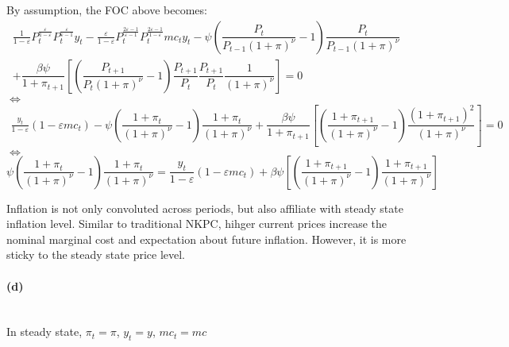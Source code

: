 \documentclass{article}
\begin{document}
By assumption, the FOC above becomes:
\begin{multline*}
    \frac{1}{1-\varepsilon}P_{t}^{\frac{\varepsilon}{1-\varepsilon}}P_{t}^{\frac{\varepsilon}{\varepsilon-1}}y_{t}-\frac{\varepsilon}{1-\varepsilon}P_{t}^{\frac{2\varepsilon-1}{\varepsilon-1}}P_{t}^{\frac{2\varepsilon-1}{1-\varepsilon}}mc_{t}y_{t}-\psi\left(\dfrac{P_{t}}{P_{t-1}\left(1+\pi\right)^{\nu}}-1\right)\dfrac{P_{t}}{P_{t-1}\left(1+\pi\right)^{\nu}}\\
    +\dfrac{\beta\psi}{1+\pi_{t+1}}\left[\left(\dfrac{P_{t+1}}{P_{t}\left(1+\pi\right)^{\nu}}-1\right)\dfrac{P_{t+1}}{P_{t}}\dfrac{P_{t+1}}{P_{t}}\dfrac{1}{\left(1+\pi\right)^{\nu}}\right]=0
\end{multline*}
$\iff$
\begin{multline*}
    \frac{y_{t}}{1-\varepsilon}\left(1-\varepsilon mc_{t}\right)-\psi\left(\dfrac{1+\pi_{t}}{\left(1+\pi\right)^{\nu}}-1\right)\dfrac{1+\pi_{t}}{\left(1+\pi\right)^{\nu}}+\dfrac{\beta\psi}{1+\pi_{t+1}}\left[\left(\dfrac{1+\pi_{t+1}}{\left(1+\pi\right)^{\nu}}-1\right)\dfrac{\left(1+\pi_{t+1}\right)^{2}}{\left(1+\pi\right)^{\nu}}\right]=0
\end{multline*}
$\iff$
\begin{equation*}
    \psi\left(\dfrac{1+\pi_{t}}{\left(1+\pi\right)^{\nu}}-1\right)\dfrac{1+\pi_{t}}{\left(1+\pi\right)^{\nu}}=\frac{y_{t}}{1-\varepsilon}\left(1-\varepsilon mc_{t}\right)+\beta\psi\left[\left(\dfrac{1+\pi_{t+1}}{\left(1+\pi\right)^{\nu}}-1\right)\dfrac{1+\pi_{t+1}}{\left(1+\pi\right)^{\nu}}\right]
\end{equation*}

Inflation is not only convoluted across periods, but also affiliate with steady state inflation level. Similar to traditional NKPC, hihger current prices increase the nominal marginal cost and expectation about future inflation. However, it is more sticky to the steady state price level. 

\paragraph*{(d)}\mbox{}\\

In steady state, $\pi_{t}=\pi$, $y_{t}=y$, $mc_{t}=mc$
\end{document}
